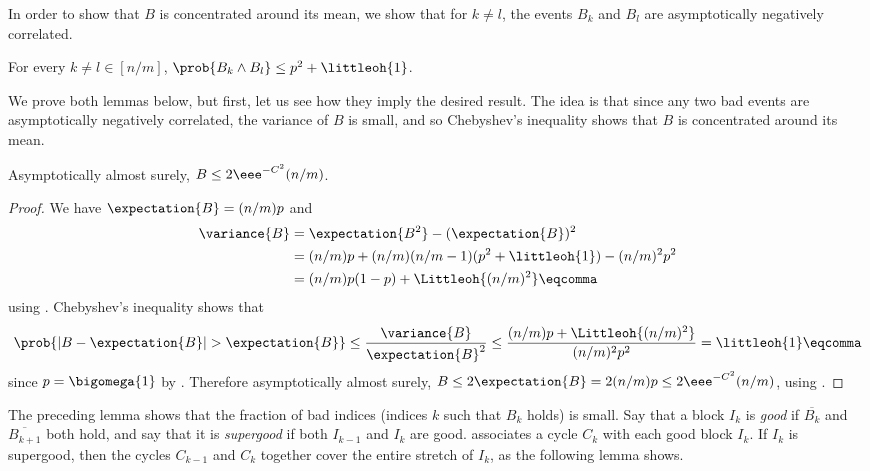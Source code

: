 In order to show that $B$ is concentrated around its mean, we show that for $k \neq l$, the events $B_k$ and $B_l$ are asymptotically negatively correlated.

\begin{lemma} \label{lem:correlation}
 For every $k \neq l \in [n/m]$, $\prob{B_k \land B_l} \leq p^2 + \littleoh{1}$.
\end{lemma}

We prove both lemmas below, but first, let us see how they imply the desired result. The idea is that since any two bad events are asymptotically negatively correlated, the variance of $B$ is small, and so Chebyshev's inequality shows that $B$ is concentrated around its mean.

\begin{lemma} \label{lem:concentration}
 Asymptotically almost surely, $B \leq 2\eee^{-C^2} (n/m)$.
\end{lemma}
\begin{proof}
 We have $\expectation{B} = (n/m)p$ and
\begin{align*}
 \variance{B} &= \expectation{B^2} - (\expectation{B})^2 \\ &=
 (n/m)p + (n/m)(n/m-1)(p^2 + \littleoh{1}) - (n/m)^2p^2 \\ &=
 (n/m)p(1-p) + \Littleoh{(n/m)^2} \eqcomma
\end{align*}
 using . Chebyshev's inequality shows that
\begin{equation}
 \prob{|B-\expectation{B}|>\expectation{B}} \leq \frac{\variance{B}}{\expectation{B}^2} \leq \frac{(n/m)p + \Littleoh{(n/m)^2}}{(n/m)^2p^2} = \littleoh{1} \eqcomma
\end{equation}
 since $p = \bigomega{1}$ by .
 Therefore asymptotically almost surely, $B \leq 2\expectation{B} = 2(n/m)p \leq 2\eee^{-C^2} (n/m)$, using .
\end{proof}

The preceding lemma shows that the fraction of bad indices (indices $k$ such that $B_k$ holds) is small. Say that a block $I_k$ is \emph{good} if $\overline{B_k}$ and $\overline{B_{k+1}}$ both hold, and say that it is \emph{supergood} if both $I_{k-1}$ and $I_k$ are good.  associates a cycle $C_k$ with each good block $I_k$. If $I_k$ is supergood, then the cycles $C_{k-1}$ and $C_k$ together cover the entire stretch of $I_k$, as the following lemma shows.

